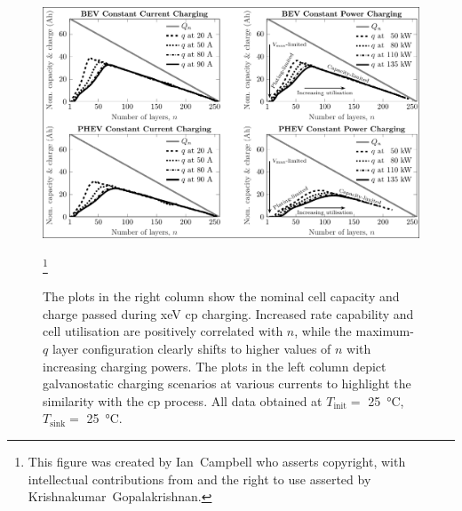 \begin{figure}[!bp]
    \begin{minipage}[t]{\textwidth}
        \centering \includegraphics[width=\textwidth,trim=4 2 3 4,clip]{fig_capacity_quadrants.pdf}
        \caption[The plots in the right column show the nominal cell capacity and charge passed
        during \gls{xeV} \gls{cp} charging. Increased rate capability and cell utilisation are positively
        correlated with $n$, while the maximum-$q$ layer configuration clearly shifts to higher
        values of $n$ with increasing charging powers. The plots in the left column depict
        galvanostatic charging scenarios at various currents to highlight the similarity with the
        \gls{cp} process. All data obtained at $T_\text{init} =$ \SI{25}{\degreeCelsius},
        $T_\text{sink} =$ \SI{25}{\degreeCelsius}.]{The plots in the right column show the nominal cell capacity and charge passed
            during \gls{xeV} \gls{cp} charging. Increased rate capability and cell utilisation are positively
            correlated with $n$, while the maximum-$q$ layer configuration clearly shifts to higher
            values of $n$ with increasing charging powers. The plots in the left column depict
            galvanostatic charging scenarios at various currents to highlight the similarity with the
            \gls{cp} process. All data obtained at $T_\text{init} =$ \SI{25}{\degreeCelsius},
        $T_\text{sink} =$ \SI{25}{\degreeCelsius}\footnotemark.}\label{fig:fig_CapacityQuadrants}
        \mpfootnotes[1]
        \footnote{This figure was created by \mbox{Ian Campbell} who asserts copyright,
            with intellectual contributions from and the right to use asserted by
        \mbox{Krishnakumar Gopalakrishnan}.}
    \end{minipage}
\end{figure}

